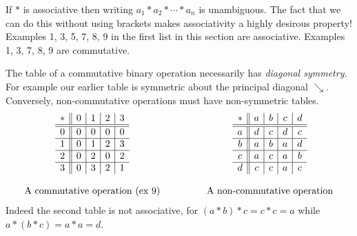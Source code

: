 If $*$ is associative then writing $a_1*a_2*\cdots *a_n$ is unambiguous. The fact that we can do this without using brackets makes associativity a highly desirous property! Examples 1, 3, 5, 7, 8, 9 in the first list in this section are associative. Examples 1, 3, 7, 8, 9 are commutative.




% 

The table of a commutative binary operation necessarily has \emph{diagonal symmetry.} For example our earlier table is symmetric about the principal diagonal $\searrow$. Conversely, non-commutative operations must have non-symmetric tables.\\
\begin{gather*}\label{eq:commute}
\begin{array}{ccc}
  \begin{array}{c||c|c|c|c}
* & 0 & 1 & 2 & 3\\
\hline\hline 0 & 0 & 0 & 0 & 0\\
\hline 1 & 0 & 1 & 2 & 3\\
\hline 2 & 0 & 2 & 0 & 2\\
\hline 3 & 0 & 3 & 2 & 1
  \end{array}
   &&
\begin{array}{c||c|c|c|c}
* & a & b & c & d\\
\hline\hline a & d & c & d & c\\
\hline b & a & b & a & d\\
\hline c & a & c & a & b\\
\hline d & c & c & a & c
  \end{array}\\
&&\\
\text{A commutative operation (ex 9)}&\hspace*{1cm}&\text{A non-commutative operation}
  \end{array}
\end{gather*}
Indeed the second table is not associative, for $(a*b)*c=c*c=a$ while $a*(b*c)=a*a=d$.

